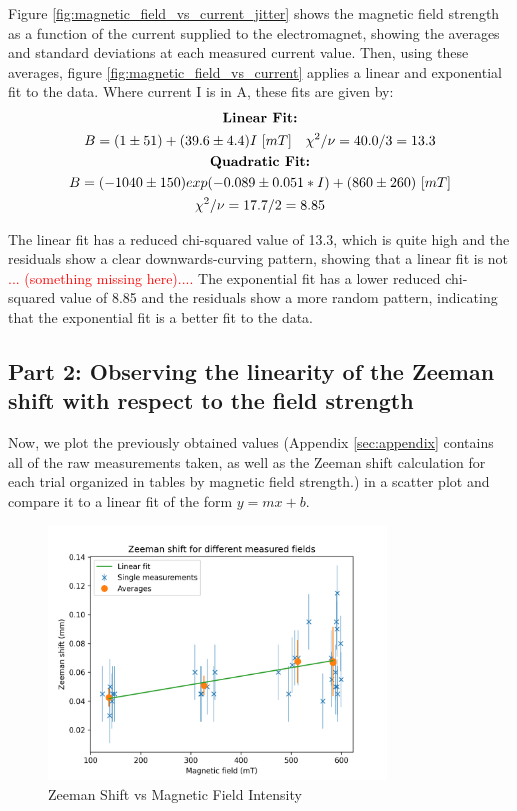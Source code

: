 Figure \ref{fig:magnetic_field_vs_current_jitter} shows the magnetic field strength as a function of the current supplied to the electromagnet, showing the averages and standard deviations at each measured current value. Then, using these averages, figure \ref{fig:magnetic_field_vs_current} applies a linear and exponential fit to the data. Where current I is in A, these fits are given by:
\begin{gather*}
    \text{\textbf{Linear Fit:}} \\
    B = (1 \pm 51) + (39.6 \pm 4.4)I~[mT] \quad \chi^2 / \nu = 40.0 / 3 = 13.3 \\
    \text{\textbf{Quadratic Fit:}} \\
    B = (-1040 \pm 150) exp (-0.089 \pm 0.051 * I) + (860 \pm 260)~[mT] \\
    \chi^2 / \nu = 17.7 / 2 = 8.85
\end{gather*}


The linear fit has a reduced chi-squared value of 13.3, which is quite high and the residuals show a clear downwards-curving pattern, showing that a linear fit is not \textcolor{red}{... (something missing here)....} The exponential fit has a lower reduced chi-squared value of 8.85 and the residuals show a more random pattern, indicating that the exponential fit is a better fit to the data.

\subsection{Part 2: Observing the linearity of the Zeeman shift with respect to the field strength}

Now, we plot the previously obtained values (Appendix \ref{sec:appendix} contains all of the raw measurements taken, as well as the Zeeman shift calculation for each trial organized in tables by magnetic field strength.)
in a scatter plot and compare it to a linear fit of the form $y = mx + b$.

\begin{figure}
    \centering
    \includegraphics[width=0.8\textwidth]{Results/img/zeeman_shift_scatter.png}
    \caption{Zeeman Shift vs Magnetic Field Intensity}
    \label{fig:zeeman_shift_scatter}
\end{figure}

